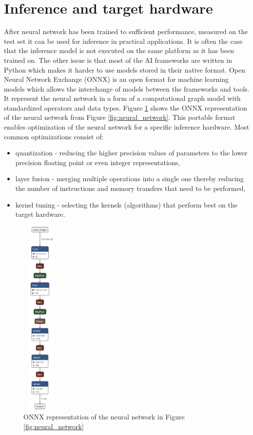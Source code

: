 \documentclass{article}
\begin{document}
\section{Inference and target hardware}



After neural network has been trained to sufficient performance, measured on the test set it can be used for inference in practical applications.
It is often the case that the inference model is not executed on the same platform as it has been trained on.
The other issue is that most of the AI frameworks are written in Python which makes it harder to use models stored in their native format.
Open Neural Network Exchange (ONNX) is an open format for machine learning models which allows the interchange of models between the frameworks and tools.
It represent the neural network in a form of a computational graph model with standardized operators and data types.
Figure \ref{fig:net_onnx} shows the ONNX representation of the neural network from Figure \ref{fig:neural_network}. 
This portable format enables optimization of the neural network for a specific inference hardware.
Most common optimizations consist of:
\begin{itemize}
    \item quantization - reducing the higher precision values of parameters to the lower precision floating point or even integer representations,
    \item layer fusion - merging multiple operations into a single one thereby reducing the number of instructions and memory transfers that need to be performed,
    \item kernel tuning - selecting the kernels (algorithms) that perform best on the target hardware.
\end{itemize}
\begin{figure}[t!]
    \centering
    \includegraphics[height=10cm,width=2cm]{net_onnx.png}
    \caption{ONNX representation of the neural network in Figure \ref{fig:neural_network}}
    \label{fig:net_onnx}
\end{figure}
\end{document}
